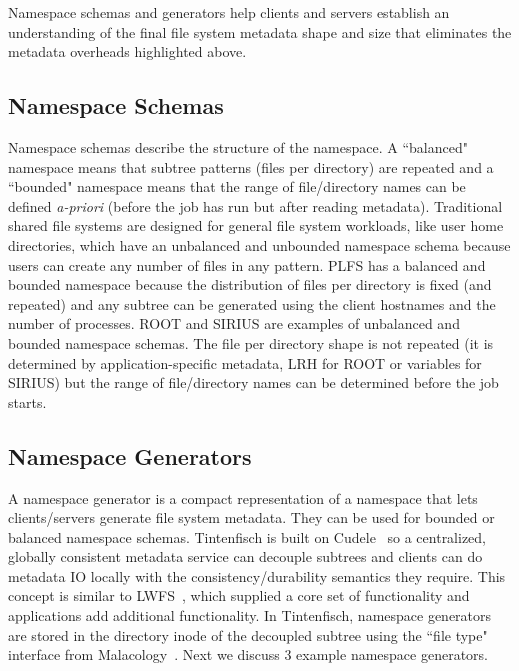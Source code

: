 Namespace schemas and generators help clients and servers establish an
understanding of the final file system metadata shape and size that eliminates
the metadata overheads highlighted above.

\subsection{Namespace Schemas}
\label{sec:namespace-schemas}

Namespace schemas describe the structure of the namespace. A ``balanced"
namespace means that subtree patterns (files per directory) are repeated and a
``bounded" namespace means that the range of file/directory names can be
defined {\it a-priori} (before the job has run but after reading metadata).
Traditional shared file systems are designed for general file system workloads,
like user home directories, which have an unbalanced and unbounded namespace
schema because users can create any number of files in any pattern.  PLFS has a
balanced and bounded namespace because the distribution of files per directory
is fixed (and repeated) and any subtree can be generated using the client
hostnames and the number of processes.  ROOT and SIRIUS are examples of
unbalanced and bounded namespace schemas. The file per directory shape is not
repeated (it is determined by application-specific metadata, LRH for ROOT or
variables for SIRIUS) but the range of file/directory names can be determined
before the job starts.

\subsection{Namespace Generators}
\label{sec:namespace-generators}

A namespace generator is a compact representation of a namespace that lets
clients/servers generate file system metadata. They can be used for bounded or
balanced namespace schemas.  Tintenfisch is built on
Cudele~\cite{sevilla:ipdps18-cudele} so a centralized, globally consistent
metadata service can decouple subtrees and clients can do metadata IO locally
with the consistency/durability semantics they require. This concept is similar
to LWFS~\cite{oldfield:cc06-lwfs}, which supplied a core set of functionality
and applications add additional functionality.  In Tintenfisch, namespace
generators are stored in the directory inode of the decoupled subtree using
the ``file type" interface from Malacology~\cite{sevilla:eurosys17-malacology}.
Next we discuss 3 example namespace generators.

